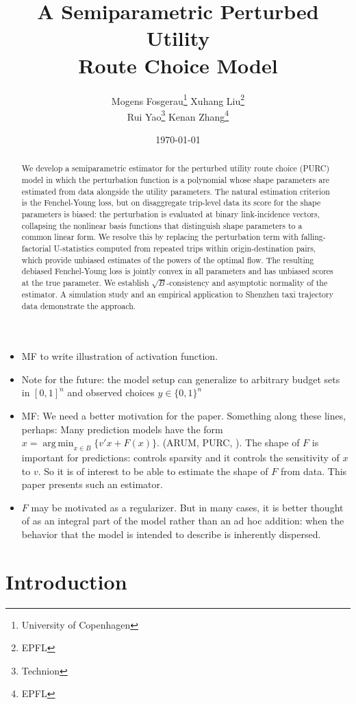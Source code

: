 \documentclass[12pt]{article}
\title{A Semiparametric Perturbed Utility \\
Route Choice Model}
\author{%
Mogens Fosgerau\thanks{University of Copenhagen} \quad
Xuhang Liu\thanks{EPFL} \\
Rui Yao\thanks{Technion} \quad
Kenan Zhang\thanks{EPFL}%
}
\date{\today}
\DeclareMathOperator*{\argmin}{arg\,min}
\begin{document}
\maketitle

\begin{abstract}
We develop a semiparametric estimator for the perturbed utility route choice (PURC) model in which the perturbation function is a polynomial whose shape parameters are estimated from data alongside the utility parameters. The natural estimation criterion is the Fenchel-Young loss, but on disaggregate trip-level data its score for the shape parameters is biased: the perturbation is evaluated at binary link-incidence vectors, collapsing the nonlinear basis functions that distinguish shape parameters to a common linear form. We resolve this by replacing the perturbation term with falling-factorial U-statistics computed from repeated trips within origin-destination pairs, which provide unbiased estimates of the powers of the optimal flow. The resulting debiased Fenchel-Young loss is jointly convex in all parameters and has unbiased scores at the true parameter. We establish $\sqrt{B}$-consistency and asymptotic normality of the estimator. A simulation study and an empirical application to Shenzhen taxi trajectory data demonstrate the approach.
\end{abstract}

\begin{itemize}
    \item MF to write illustration of activation function.
    \item Note for the future: the model setup can generalize to arbitrary budget sets in $[0,1]^n$ and observed choices $y\in \{0,1\}^n $ 
    \item MF: We need a better motivation for the paper. Something along these lines, perhaps: Many prediction models have the form $x=\argmin_{x\in B}\{v'x+F(x)\}.$ (ARUM, PURC, ). The shape of $F$ is important for predictions: controls sparsity and it controls the sensitivity of $x$ to $v$.  So it is of interest to be able to estimate the shape of $F$ from data. This paper presents such an estimator. 
    \item $F$ may be motivated as a regularizer. But in many cases, it is better thought of as an integral part of the model rather than an ad hoc addition: when the behavior that the model is intended to describe is inherently dispersed. 
\end{itemize}

\section{Introduction}\label{sec:introduction}
\end{document}
